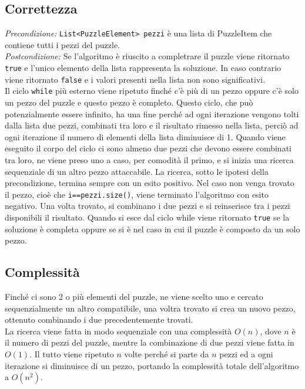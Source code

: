 \documentclass[a4paper, 11pt]{article}
\begin{document}
\subsection{Correttezza}
\textit{Precondizione:} \texttt{List<PuzzleElement> pezzi} è una lista di PuzzleItem che contiene tutti i pezzi del puzzle.\\
\textit{Postcondizione:} Se l'algoritmo è riuscito a completrare il puzzle viene ritornato \texttt{true} e l'unico elemento della lista rappresenta la soluzione. In caso contrario viene ritornato \texttt{false} e i valori presenti nella lista non sono significativi.
\\
Il ciclo \texttt{while} più esterno viene ripetuto finché c'è più di un pezzo oppure c'è solo un pezzo del puzzle e questo pezzo è completo.
Questo ciclo, che può potenzialmente essere infinito, ha una fine perché ad ogni iterazione vengono tolti dalla lista due pezzi, combinati tra loro e il risultato rimesso nella lista, perciò ad ogni iterazione il numero di elementi della lista diminuisce di 1.
Quando viene eseguito il corpo del ciclo ci sono almeno due pezzi che devono essere combinati tra loro, ne viene preso uno a caso, per comodità il primo, e si inizia una ricerca sequenziale di un altro pezzo attaccabile.
La ricerca, sotto le ipotesi della precondizione, termina sempre con un esito positivo. Nel caso non venga trovato il pezzo, cioè che \texttt{i==pezzi.size()}, viene terminato l'algoritmo con esito negativo.
Una volta trovato, si combinano i due pezzi e si reinserisce tra i pezzi disponibili il risultato.
Quando si esce dal ciclo while viene ritornato \texttt{true} se la soluzione è completa oppure se si è nel caso in cui il puzzle è composto da un solo pezzo.

\subsection{Complessità}

Finché ci sono 2 o più elementi del puzzle, ne viene scelto uno e cercato sequenzialmente un altro compatibile, una voltra trovato si crea un nuovo pezzo, ottenuto combinando i due precedentemente trovati. \\
La ricerca viene fatta in modo sequenziale con una complessità $O(n)$, dove $n$ è il numero di pezzi del puzzle, mentre la combinazione di due pezzi viene fatta in $O(1)$.
Il tutto viene ripetuto $n$ volte perché si parte da $n$ pezzi ed a ogni iterazione si diminuisce di un pezzo, portando la complessità totale dell'algoritmo a $O(n^2)$.
\end{document}
